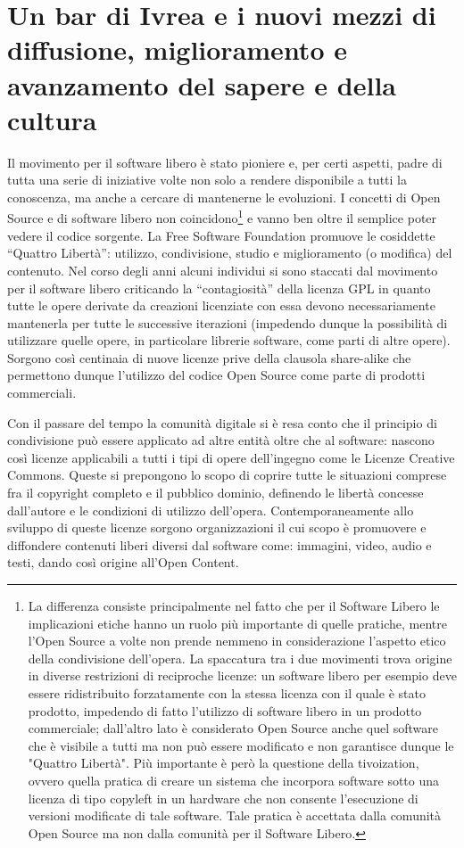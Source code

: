 \chapter{Un bar di Ivrea e i nuovi mezzi di diffusione, miglioramento e avanzamento del sapere e della cultura}
\label{chapter:4}
Il movimento per il software libero è stato pioniere e, per certi aspetti, padre di tutta
una serie di iniziative volte non solo a rendere disponibile a tutti la conoscenza, ma anche a
cercare di mantenerne le evoluzioni. I concetti di Open Source e di software libero non
coincidono\footnote{La differenza consiste principalmente nel fatto che per il Software Libero le implicazioni etiche hanno un ruolo più importante di quelle
pratiche, mentre l'Open Source a volte non prende nemmeno in considerazione l'aspetto etico della condivisione dell'opera. La spaccatura
tra i due movimenti trova origine in diverse restrizioni di reciproche licenze: un software libero per esempio deve essere ridistribuito
forzatamente con la stessa licenza con il quale è stato prodotto, impedendo di fatto l'utilizzo di software libero in un prodotto commerciale;
dall'altro lato è considerato Open Source anche quel software che è visibile a tutti ma non può essere modificato e non garantisce dunque
le "Quattro Libertà". Più importante è però la questione della tivoization, ovvero quella pratica di creare un sistema che incorpora software
sotto una licenza di tipo copyleft in un hardware che non consente l'esecuzione di versioni modificate di tale software. Tale pratica è
accettata dalla comunità Open Source ma non dalla comunità per il Software Libero.} \parencite{stallman} e vanno ben oltre il semplice poter vedere il codice sorgente.
La Free Software Foundation promuove le cosiddette “Quattro Libertà”: utilizzo,
condivisione, studio e miglioramento (o modifica) del contenuto. Nel corso degli anni alcuni
individui si sono staccati dal movimento per il software libero criticando la “contagiosità”
della licenza GPL in quanto tutte le opere derivate da creazioni licenziate con essa devono
necessariamente mantenerla per tutte le successive iterazioni (impedendo dunque la
possibilità di utilizzare quelle opere, in particolare librerie software, come parti di altre opere).
Sorgono così centinaia di nuove licenze prive della clausola share-alike che permettono
dunque l’utilizzo del codice Open Source come parte di prodotti commerciali.

Con il passare del tempo la comunità digitale si è resa conto che il principio di
condivisione può essere applicato ad altre entità oltre che al software: nascono così licenze
applicabili a tutti i tipi di opere dell’ingegno come le Licenze Creative Commons. Queste si
prepongono lo scopo di coprire tutte le situazioni comprese fra il copyright completo e il
pubblico dominio, definendo le libertà concesse dall’autore e le condizioni di utilizzo
dell’opera. Contemporaneamente allo sviluppo di queste licenze sorgono organizzazioni il
cui scopo è promuovere e diffondere contenuti liberi diversi dal software come: immagini,
video, audio e testi, dando così origine all’Open Content.

